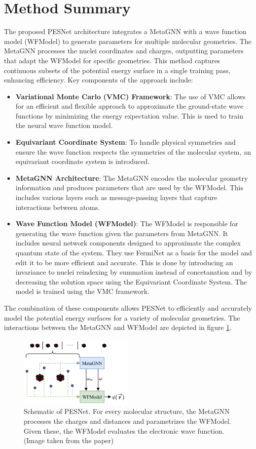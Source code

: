 \documentclass{article}
\begin{document}
\section{Method Summary}
The proposed PESNet architecture integrates a MetaGNN with a wave function model (WFModel) to generate parameters for multiple molecular geometries. The MetaGNN processes the nuclei coordinates and charges, outputting parameters that adapt the WFModel for specific geometries. This method captures continuous subsets of the potential energy surface in a single training pass, enhancing efficiency. Key components of the approach include:
\begin{itemize}
    \item \textbf{Variational Monte Carlo (VMC) Framework}: The use of VMC allows for an efficient and flexible approach to approximate the ground-state wave functions by minimizing the energy expectation value. This is used to train the neural wave function model.
    \item \textbf{Equivariant Coordinate System}: To handle physical symmetries and ensure the wave function respects the symmetries of the molecular system, an equivariant coordinate system is introduced.
    \item \textbf{MetaGNN Architecture}: The MetaGNN encodes the molecular geometry information and produces parameters that are used by the WFModel. This includes various layers such as message-passing layers that capture interactions between atoms.
    \item \textbf{Wave Function Model (WFModel)}: The WFModel is responsible for generating the wave function given the parameters from MetaGNN. It includes neural network components designed to approximate the complex quantum state of the system. They use FermiNet as a basis for the model and edit it to be more efficient and accurate. This is done by introducing an invariance to nuclei reindexing by summation instead of concetanation and by decreasing the solution space using the Equivariant Coordinate System. The model is trained using the VMC framework.
\end{itemize}
The combination of these components allows PESNet to efficiently and accurately model the potential energy surfaces for a variety of molecular geometries. The interactions between the MetaGNN and WFModel are depicted in figure \ref{fig:schematic}.

\begin{figure}[h]
    \centering
    \includegraphics[width=0.5\textwidth]{schematic_pesnet.png}
    \caption{Schematic of PESNet. For every molecular structure, the MetaGNN processes the charges and distances and parametrizes the WFModel. Given these, the WFModel evaluates the electronic wave function. (Image taken from the paper)}
    \label{fig:schematic}
\end{figure}
\end{document}
